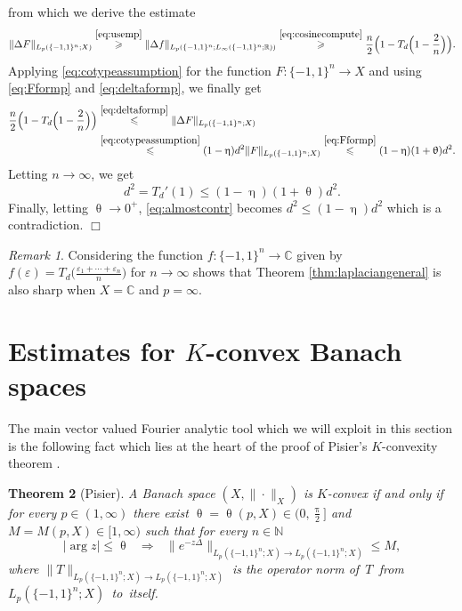 \documentclass[11pt,reqno]{amsart}
\renewcommand{\leq}{\leqslant}
\renewcommand{\geq}{\geqslant}
\renewcommand{\pi}{\uppi}
\newcommand{\e}{\varepsilon}
\newcommand{\R}{\mathbb R}
\newcommand{\1}{\mathbf 1}
\newtheorem{theorem}{Theorem}
\theoremstyle{remark}
\newtheorem{remark}[theorem]{Remark}
\newcommand{\C}{\mathbb C}
\newcommand{\N}{\mathbb N}
\renewcommand{\theta}{\uptheta}
\renewcommand{\pi}{\uppi}
\renewcommand{\eta}{\upeta}
\renewcommand{\pi}{\uppi}
\begin{document}
from which we derive the estimate
\begin{equation} \label{eq:deltaformp}
\|\Delta F\|_{L_p(\{-1,1\}^n;X)} \stackrel{\eqref{eq:usemp}}{\geq} \|\Delta f\|_{L_p(\{-1,1\}^n;L_\infty(\{-1,1\}^n;\R))} \stackrel{\eqref{eq:cosinecompute}}{\geq}  \frac{n}{2}\Big( 1-T_d\Big(1-\frac{2}{n}\Big)\Big).
\end{equation}
Applying \eqref{eq:cotypeassumption} for the function $F:\{-1,1\}^n\to X$ and using \eqref{eq:Fformp} and \eqref{eq:deltaformp}, we finally get
\begin{equation}
\begin{split}
\frac{n}{2} \Big( 1 - T_d\Big(1-\frac{2}{n}\Big)\Big) &
\stackrel{\eqref{eq:deltaformp}}{\leq} \|\Delta F\|_{L_p(\{-1,1\}^n;X)} \\ & \stackrel{\eqref{eq:cotypeassumption}}{\leq} (1-\eta) d^2 \|F\|_{L_p(\{-1,1\}^n;X)}  \stackrel{\eqref{eq:Fformp}}{\leq} (1-\eta)(1+\theta)d^2.
\end{split}
\end{equation}
Letting $n\to\infty$, we get
\begin{equation} \label{eq:almostcontr}
d^2=T_d'(1) \leq (1-\eta)(1+\theta)d^2.
\end{equation}
Finally, letting $\theta\to0^+$, \eqref{eq:almostcontr} becomes $d^2\leq (1-\eta)d^2$ which is a contradiction.
\hfill$\Box$

\begin{remark} \label{rem:sharpness}
Considering the function $f:\{-1,1\}^n\to\C$ given by $f(\e) = T_d\big(\frac{\e_1+\cdots+\e_n}{n}\big)$ for $n\to\infty$ shows that Theorem \ref{thm:laplaciangeneral} is also sharp when $X=\C$ and $p=\infty$.
\end{remark}


\section{Estimates for $K$-convex Banach spaces} \label{sec:3}

The main vector valued Fourier analytic tool which we will exploit in this section is the following fact which lies at the heart of the proof of Pisier's $K$-convexity theorem \cite{Pis82}.

\begin{theorem}  [Pisier] \label{thm:pisKconv}
A Banach space $(X,\|\cdot\|_X)$ is $K$-convex if and only if for every $p\in(1,\infty)$ there exist $\theta=\theta(p,X)\in\big(0,\frac{\pi}{2}\big]$ and $M=M(p,X)\in[1,\infty)$ such that for every $n\in\N$
\begin{equation} \label{eq:conclusionKconv}
|\arg z|\leq \theta \ \ \ \Longrightarrow \ \ \ \|e^{-z\Delta}\|_{{L_p(\{-1,1\}^n;X)}\to {L_p(\{-1,1\}^n;X)}} \leq M,
\end{equation}
where $\|T\|_{{L_p(\{-1,1\}^n;X)}\to {L_p(\{-1,1\}^n;X)}}$ is the operator norm of\mbox{ $T$ from ${L_p(\{-1,1\}^n;X)}$ to itself.}
\end{theorem}
\end{document}
